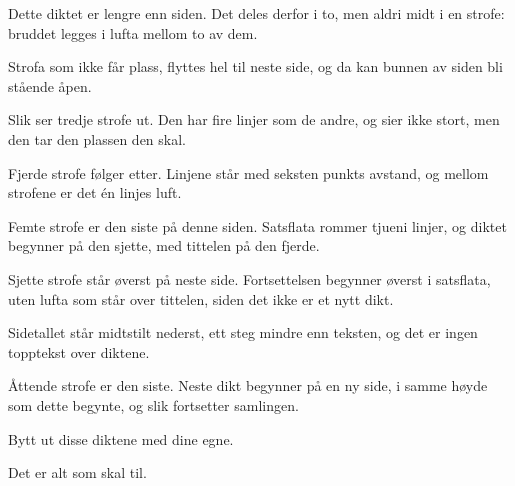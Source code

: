 \documentclass[12pt,twoside]{book}
\begin{document}

\begin{dikt}
Dette diktet er lengre enn siden.
Det deles derfor i to,
men aldri midt i en strofe:
bruddet legges i lufta mellom to av dem.

Strofa som ikke får plass,
flyttes hel til neste side,
og da kan bunnen av siden
bli stående åpen.

Slik ser tredje strofe ut.
Den har fire linjer som de andre,
og sier ikke stort,
men den tar den plassen den skal.

Fjerde strofe følger etter.
Linjene står med seksten punkts avstand,
og mellom strofene
er det én linjes luft.

Femte strofe er den siste på denne siden.
Satsflata rommer tjueni linjer,
og diktet begynner på den sjette,
med tittelen på den fjerde.

Sjette strofe står øverst på neste side.
Fortsettelsen begynner øverst i satsflata,
uten lufta som står over tittelen,
siden det ikke er et nytt dikt.

Sidetallet står midtstilt nederst,
ett steg mindre enn teksten,
og det er ingen topptekst
over diktene.

Åttende strofe er den siste.
Neste dikt begynner på en ny side,
i samme høyde som dette begynte,
og slik fortsetter samlingen.
\end{dikt}

\begin{dikt}
Bytt ut disse diktene med dine egne.

Det er alt som skal til.
\end{dikt}
\end{document}
